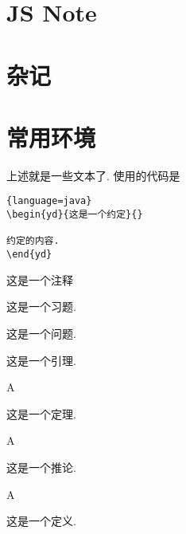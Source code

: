 \documentclass[a4,10pt]{ctexart}
\begin{document}
\section{JS Note}

\section{杂记}

\section{常用环境}


上述就是一些文本了. 使用的代码是
\begin{lstlisting}{language=java}
\begin{yd}{这是一个约定}{}
              
约定的内容.
\end{yd}
\end{lstlisting}

\begin{zs}
        
这是一个注释
    
\end{zs}
    
\begin{xt}
        
这是一个习题.
    
\end{xt}
    
\begin{lt}
        
这是一个问题.
    
\end{lt}

\begin{yl}
        
这是一个引理.
    
\end{yl}

\begin{dl}{A}{}
        
这是一个定理.
    
\end{dl}
    
\begin{tl}{A}{}
        
这是一个推论.
    
\end{tl}

\begin{dy}{A}{}
        
这是一个定义.
    
\end{dy}
\end{document}
